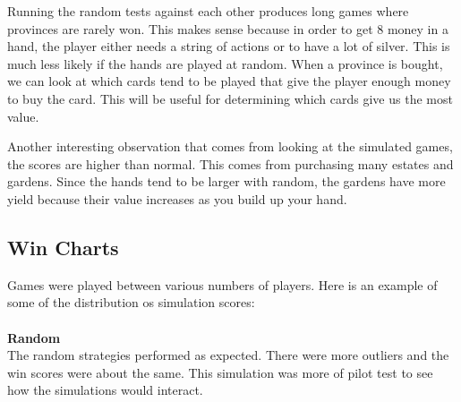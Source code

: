 \documentclass[11pt, oneside]{article}   	%
\begin{document}
Running the random tests against each other produces long games where provinces are rarely won. This makes sense because in order to get 8 money in a hand, the player either needs a string of actions or to have a lot of silver. This is much less likely if the hands are played at random. When a province is bought, we can look at which cards tend to be played that give the player enough money to buy the card. This will be useful for determining which cards give us the most value. 

Another interesting observation that comes from looking at the simulated games, the scores are higher than normal. This comes from purchasing many estates and gardens. Since the hands tend to be larger with random, the gardens have more yield because their value increases as you build up your hand.

\subsection{Win Charts}

Games were played between various numbers of players. Here is an example of some of the distribution os simulation scores: 
\\
\\
\textbf{Random} 
\\

The random strategies performed as expected. There were more outliers and the win scores were about the same. This simulation was more of pilot test to see how the simulations would interact. 
\end{document}
